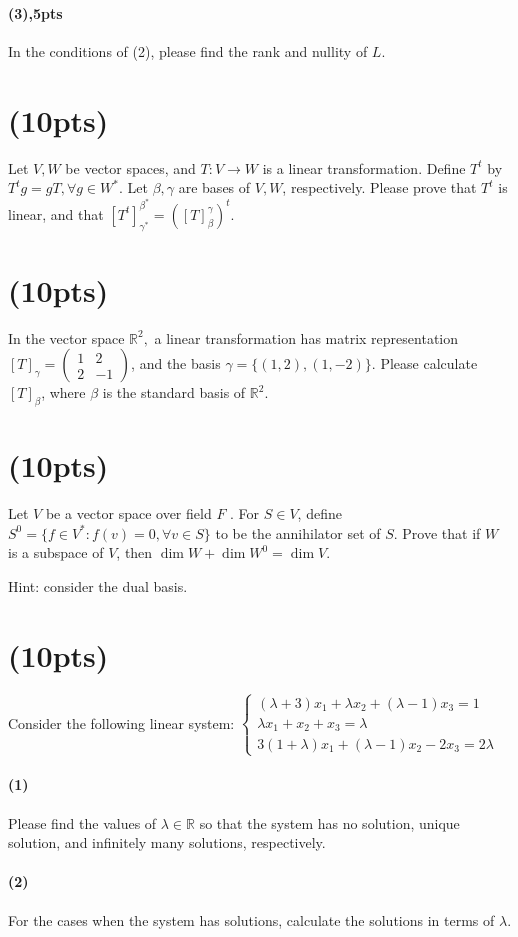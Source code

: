 \documentclass{article}
\begin{document}
\paragraph{(3),5pts}
In the conditions of (2), please find the rank and nullity of $L$.
\section{(10pts)}
Let $V,W$ be vector spaces, and $T:V\rightarrow W$ is a linear transformation. Define $T^t$ by $T^t g=gT,\forall g\in W^*$. Let $\beta,\gamma$ are bases of $V,W$, respectively. Please prove that $T^t$ is linear, and that $[T^t]_{\gamma^*}^{\beta^*}=([T]_{\beta}^{\gamma})^t$. 
\section{(10pts)}
In the vector space $\mathbb{R}^2,$ a linear transformation has matrix representation $[T]_\gamma=\begin{pmatrix}
    1&2\\2&-1
\end{pmatrix}$, and the basis $\gamma=\{(1,2),(1,-2)\}$. Please calculate $[T]_\beta$, where $\beta$ is the standard basis of $\mathbb{R}^2$.
\section{(10pts)}
Let $V$ be a vector space over field $F$ . For $S\in V$, define $S^0=\{f\in V^*: f(v)=0,\forall v\in S\}$ to be the annihilator set of $S$. Prove that if $W$ is a subspace of $V$, then $\dim W+\dim W^0=\dim V$.

Hint: consider the dual basis.
\section{(10pts)}
Consider the following linear system:
$\begin{cases} (\lambda+3)x_1+\lambda x_2+(\lambda -1)x_3=1\\ \lambda x_1+x_2+x_3=\lambda\\ 3(1+\lambda) x_1+(\lambda-1) x_2-2 x_3=2\lambda\end{cases}$
\paragraph{(1)}Please find the values of $\lambda\in \mathbb{R}$ so that the system has no solution, unique solution, and infinitely many solutions, respectively.
\paragraph{(2)} For the cases when the system has solutions, calculate the solutions in terms of $\lambda$.
\end{document}

